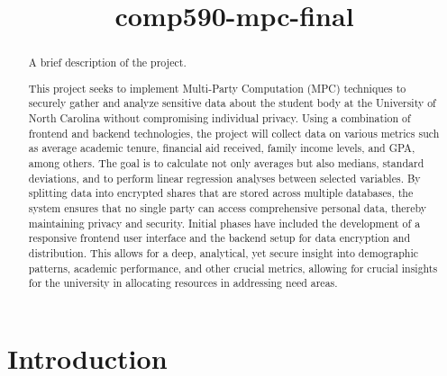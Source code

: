 \documentclass[conference]{IEEEtran}
\begin{document}
\title{comp590-mpc-final}


\author{
\and
{}
\and
{}
\and
{}
\and
{}
}

\maketitle

\begin{abstract}


A brief description of the project.

This project seeks to implement Multi-Party Computation (MPC) techniques to securely gather and analyze sensitive data about the student body at the University of North Carolina without compromising individual privacy.
Using a combination of frontend and backend technologies, the project will collect data on various metrics such as average academic tenure, financial aid received, family income levels, and GPA, among others. 
The goal is to calculate not only averages but also medians, standard deviations, and to perform linear regression analyses between selected variables. 
By splitting data into encrypted shares that are stored across multiple databases, the system ensures that no single party can access comprehensive personal data, thereby maintaining privacy and security. 
Initial phases have included the development of a responsive frontend user interface and the backend setup for data encryption and distribution. 
This allows for a deep, analytical, yet secure insight into demographic patterns, academic performance, and other crucial metrics, allowing for crucial insights for the university in allocating resources in addressing need areas. 

\end{abstract}


\section{Introduction}


\end{document}
